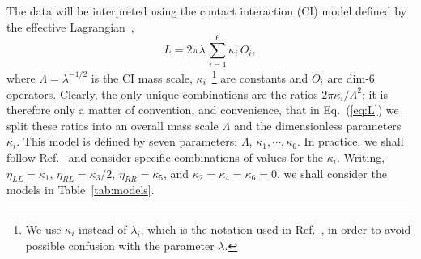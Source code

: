 \documentclass[aps,prd,preprint,nofootinbib]{revtex4}
\begin{document}
The data will be interpreted using the contact interaction (CI) model defined by the effective
Lagrangian~\cite{bib:Gao},
\begin{equation}
	L = 2 \pi \lambda \, \sum_{i=1}^6 \kappa_i \, O_i,
	\label{eq:L}
\end{equation}
where $\Lambda = \lambda^{-1/2}$ is the CI mass scale, $\kappa_i$~\footnote{We use $\kappa_i$ instead of $\lambda_i$, which is the notation used in Ref.~\cite{bib:Gao}, in order to avoid possible confusion with the parameter $\lambda$.} are constants and $O_i$ are dim-6 operators. Clearly,
the only unique combinations are the ratios $2\pi \kappa_i / \Lambda^2$; it is therefore only a matter of convention, and convenience, that in Eq.~(\ref{eq:L}) we split these ratios into an overall mass scale $\Lambda$ and the dimensionless parameters $\kappa_i$.
This model is defined by seven parameters: $\Lambda$, $\kappa_1,\cdots, \kappa_6$. In practice,  we shall follow Ref.~\cite{bib:CMSCI12} and consider specific combinations
of values for the $\kappa_i$. 
Writing, $\eta_{LL} = \kappa_1$, $\eta_{RL} = \kappa_3 / 2$, $\eta_{RR} = \kappa_5$, and $\kappa_2 = \kappa_4 = \kappa_6 = 0$, we shall
consider the models in Table~\ref{tab:models}.
\end{document}
